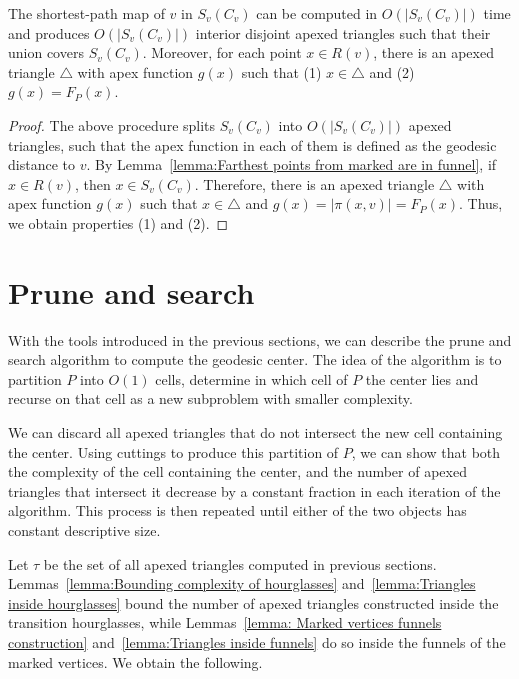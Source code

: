 \documentclass[a4paper,UKenglish]{lipics}
\newcommand{\F}[2]{\ensuremath{F_{\scriptscriptstyle #1}(#2)}}
\newcommand{\fn}[2]{\ensuremath{S_{\scriptscriptstyle #1}(#2)}}
\newcommand{\g}[2]{\ensuremath{|\pi(#1, #2)|}}
\begin{document}
\begin{lemma}\label{lemma:Triangles inside funnels}
The shortest-path map of $v$ in $\fn{v}{C_v}$ can be computed in $O(|\fn{v}{C_v}|)$ time and produces $O(|\fn{v}{C_v}|)$ interior disjoint apexed triangles such that their union covers $\fn{v}{C_v}$. 
Moreover, for each point $x\in R(v)$,  
there is an apexed triangle $\triangle$ with apex function $g(x)$ such that 
(1) $x\in \triangle$ and (2) $g(x) = \F{P}{x}$.
\end{lemma}
\begin{proof}
The above procedure splits $\fn{v}{C_v}$ into $O(|\fn{v}{C_v}|)$ apexed triangles, such that the apex function in each of them is defined as the geodesic distance to $v$. 
By Lemma~\ref{lemma:Farthest points from marked are in funnel}, if $x\in R(v)$, then $x\in \fn{v}{C_v}$. 
Therefore, there is an apexed triangle $\triangle$ with apex function $g(x)$ such that $x\in \triangle$ and $g(x) = \g{x}{v} = \F{P}{x}$. Thus, we obtain properties (1) and (2).
\end{proof}

\section{Prune and search}\label{section:Prune and search}
With the tools introduced in the previous sections, we can describe the prune and search algorithm to compute the geodesic center. 
The idea of the algorithm is to partition $P$ into $O(1)$ cells, determine in which cell of $P$ the center lies and recurse on that cell as a new subproblem with smaller complexity.

We can discard all apexed triangles that do not intersect the new cell containing the center. Using cuttings to produce this partition of $P$, we can show that both the complexity of the cell containing the center, and the number of apexed triangles that intersect it decrease by a constant fraction in each iteration of the algorithm. This process is then repeated until either of the two objects has constant descriptive size. 

Let $\tau$ be the set of all apexed triangles computed in previous sections. 
Lemmas~\ref{lemma:Bounding complexity of hourglasses} and~\ref{lemma:Triangles inside hourglasses} bound the number of apexed triangles constructed inside the transition hourglasses, while Lemmas~\ref{lemma: Marked vertices funnels construction} and~\ref{lemma:Triangles inside funnels} do so inside the funnels of the marked vertices. We obtain the following.
\end{document}
